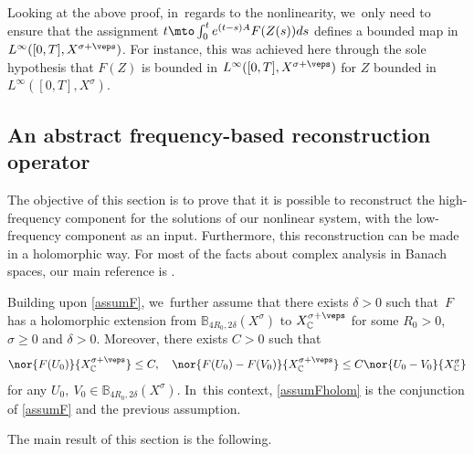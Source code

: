 \begin{remark}\label{rk:abs-prop-reg}
Looking at the above proof, in~regards to the nonlinearity, we~only need to ensure that the assignment $t\mto \int_0^t e^{(t-s)A}F(Z(s))ds$ defines a bounded map in $L^\infty([0, T], X^{\sigma+\veps})$. For instance, this was achieved here through the sole hypothesis that $F(Z)$ is bounded in $L^\infty([0, T], X^{\sigma+\veps})$ for $Z$ bounded in $L^\infty([0, T], X^\sigma)$.
\end{remark}

\subsection{An abstract frequency-based reconstruction operator} The objective of this section is to prove that it is possible to reconstruct the high-frequency component for the solutions of our nonlinear system, with the low-frequency component as an input. Furthermore, this reconstruction can be made in a holomorphic way. For most of the facts about complex analysis in Banach spaces, our main reference is \cite{Muj86}.

Building upon \cref{assumF}, we~further assume that there exists $\delta>0$ such that~$F$ has a holomorphic extension from $\mathbb{B}_{4R_{0},2\delta}(X^{\sigma})$ to $X^{\sigma+\veps}_{\mathbb{C}}$ for some $R_{0}>0$, $\sigma\geq 0$ and $\delta>0$. Moreover, there exists $C>0$ such that
\begin{align}
\label{boundFanalytic}
\nor{F(U_{0})}{X^{\sigma+\veps}_{\mathbb{C}}}\leq C,\quad \nor{F(U_{0})-F(V_{0})}{X^{\sigma+\veps}_{\mathbb{C}}}\leq C \nor{U_{0}-V_{0}}{X^{\sigma}_{\mathbb{C}}}
\end{align}
for any $U_{0},~V_{0}\in \mathbb{B}_{4R_{0},2\delta}(X^{\sigma})$. In~this context, \cref{assumFholom} is the conjunction of \cref{assumF} and the previous assumption.

The main result of this section is the following.

